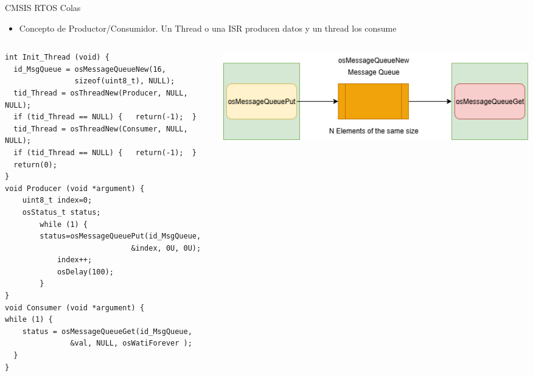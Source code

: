 \begin{frame}[fragile]{CMSIS RTOS Colas}
\begin{itemize}
    \item Concepto de Productor/Consumidor. Un Thread o una ISR producen datos y un thread los consume
\end{itemize}
\begin{columns}
  \begin{column}{0.45\textwidth}     
    \begin{verbatim}
int Init_Thread (void) {
  id_MsgQueue = osMessageQueueNew(16, 
                sizeof(uint8_t), NULL);
  tid_Thread = osThreadNew(Producer, NULL, NULL);
  if (tid_Thread == NULL) {   return(-1);  }
  tid_Thread = osThreadNew(Consumer, NULL, NULL);
  if (tid_Thread == NULL) {   return(-1);  }
  return(0);
}
void Producer (void *argument) {
    uint8_t index=0;
    osStatus_t status;
        while (1) {
        status=osMessageQueuePut(id_MsgQueue, 
                             &index, 0U, 0U);
        	index++;
        	osDelay(100);
        }
}
void Consumer (void *argument) {
while (1) {
	status = osMessageQueueGet(id_MsgQueue, 
               &val, NULL, osWatiForever );
  }
}

    \end{verbatim}
    \end{column}
    \begin{column}{0.55\textwidth}
     \includegraphics[scale=0.35]{presentation/queues.drawio.png}
    \end{column}
\end{columns}
\end{frame}

